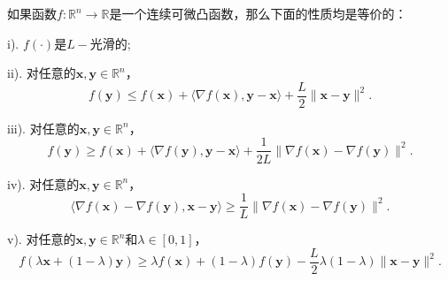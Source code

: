 \begin{theorem}[$L$-光滑的多种刻画性质]
    如果函数$f: \mathbb{R}^{n} \rightarrow \mathbb{R}$是一个连续可微凸函数，那么下面的性质均是等价的：
\par     i). $f(\cdot)$是$L -$光滑的; 
\par    ii). 对任意的$\bm{x}, \bm{y} \in \mathbb{R}^{n}$，
    \begin{equation}
        f(\bm{y}) \leq f(\bm{x})+\langle\nabla f(\bm{x}), \bm{y}-\bm{x}\rangle+\frac{L}{2}\|\bm{x}-\bm{y}\|^{2} .
        \nonumber
    \end{equation} 
\par    iii). 对任意的$\bm{x}, \bm{y} \in \mathbb{R}^{n}$，
    \begin{equation}
        f(\bm{y}) \geq f(\bm{x})+\langle\nabla f(\bm{y}), \bm{y}-\bm{x}\rangle+\frac{1}{2 L}\|\nabla f(\bm{x})-\nabla f(\bm{y})\|^{2} .
        \nonumber
    \end{equation}
\par    iv). 对任意的$\bm{x}, \bm{y} \in \mathbb{R}^{n}$，
    \begin{equation}
        \langle\nabla f(\bm{x})-\nabla f(\bm{y}), \bm{x}-\bm{y}\rangle \geq \frac{1}{L}\|\nabla f(\bm{x})-\nabla f(\bm{y})\|^{2} .
        \nonumber
    \end{equation}
\par     v). 对任意的$\bm{x}, \bm{y} \in \mathbb{R}^{n}$和$\lambda \in[0,1]$，
    \begin{equation}
        f(\lambda \bm{x}+(1-\lambda) \bm{y}) \geq \lambda f(\bm{x})+(1-\lambda) f(\bm{y})-\frac{L}{2} \lambda(1-\lambda)\|\bm{x}-\bm{y}\|^{2} .
        \nonumber
    \end{equation}
    \label{thm1_1}
\end{theorem}

